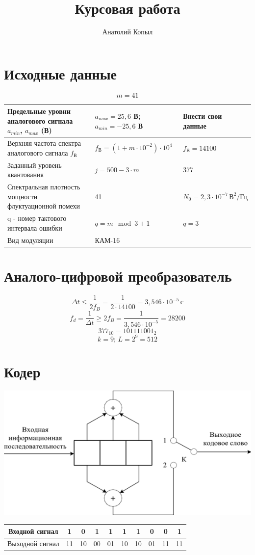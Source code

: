 \documentclass[a4paper, 12pt]{article}
\author{Анатолий Копыл}
\title{Курсовая работа}
\begin{document}
\section{Исходные данные}
\[ m=41 \]
\begin{center}
  \begin{tabular}{ | p{5cm} | p{5cm} | p{5cm} | } 
    \hline
    Предельные уровни аналогового сигнала \(a_{min}\), \(a_{max}\) (В) & \(a_{max}=25,6\) В;\newline\(a_{min}=-25,6\) В & Внести свои данные \\
    \hline
    Верхняя частота спектра аналогового сигнала \(f_В\) & \(f_В =(1+m\cdot 10^{-2})\cdot 10^4\) & \(f_В =14100\) \\ 
    \hline
    Заданный уровень квантования & \(j=500-3\cdot m\) & 377 \\
    \hline
    Спектральная плотность мощности флуктуационной помехи & 41 & \(N_0=2,3\cdot 10^{-7}\, В^2/Гц\)\\
    \hline
    q - номер тактового интервала ошибки & \(q=m\mod{3}+1\) & \(q=3\)\\
    \hline
    Вид модуляции & КАМ-16 & \\
    \hline
  \end{tabular}
\end{center}

\section{Аналого-цифровой преобразователь}
\[ \Delta t \leq \frac{1}{2f_B}=\frac1 {2\cdot 14100} = 3,546\cdot 10^{-5}\, с \]
\[ f_d=\frac{1}{\Delta t}\geq 2f_B=\frac{1}{3,546\cdot 10^{-5}}=28200 \]
\[ 377_{10}=101111001_2 \]
\[ k=9;\, L=2^9 = 512 \]

\section{Кодер}
\begin{center}
  \includegraphics[scale=0.8]{coder}

  \begin{tabular}{ | c | c | c | c | c | c | c | c | c | c | }
    \hline
    Входной сигнал &1&0&1&1&1&1&0&0&1\\
    \hline
    Выходной сигнал &11&10&00&01&10&10&01&11&11\\
    \hline
  \end{tabular}
\end{center}
\end{document}
